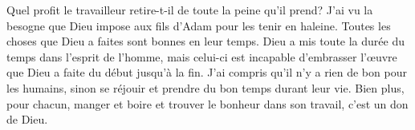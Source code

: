 Quel profit le travailleur retire-t-il de toute la peine qu’il prend?
J’ai vu la besogne que Dieu impose aux fils d’Adam pour les tenir en haleine.
Toutes les choses que Dieu a faites sont bonnes en leur temps.
	Dieu a mis toute la durée du temps dans l’esprit de l’homme,
	mais celui-ci est incapable d’embrasser l’œuvre que Dieu a faite
		du début jusqu’à la fin.
J’ai compris qu’il n’y a rien de bon pour les humains,
	sinon se réjouir et prendre du bon temps durant leur vie.
Bien plus, pour chacun, manger et boire et trouver le bonheur dans son travail,
		c’est un don de Dieu.
